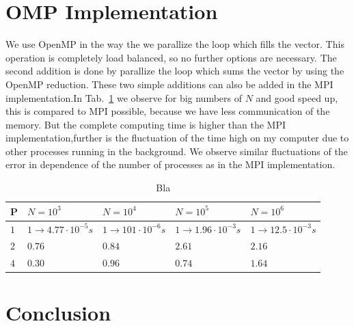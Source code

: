 \section{OMP Implementation}

We use OpenMP in the way the we parallize the loop which fills the vector. This operation is completely load balanced, so no further options are necessary. The second addition is done by parallize the loop which sums the vector by using the OpenMP reduction. These two simple additions can also be added in the MPI implementation.In Tab.~\ref{tab:speed_up1_omp} we observe for big numbers of $N$ and good speed up, this is compared to MPI possible, because we have less communication of the memory. But the complete computing time is higher than the MPI implementation,further is the fluctuation of the time high on my computer due to other processes running in the background. We observe similar fluctuations of the error in dependence of the number of processes as in the MPI implementation.
\begin{table}
\centering
    \begin{tabular}{| l | l | l | l | l |}
    
    \hline
    P & $N = 10^3$ & $N = 10^4$ & $N = 10^5$ & $N = 10^6$\\  \hline
	$1$ & $1 \rightarrow 4.77 \cdot 10^{-5} s$ & $1 \rightarrow 101 \cdot 10^{-6} s$ & $1 \rightarrow 1.96 \cdot 10^{-3} s$ & $1 \rightarrow 12.5 \cdot 10^{-3} s$\\    
    $2$ & $0.76$ & $0.84$ & $2.61$ &$2.16$ \\
    $4$ & $0.30$ & $0.96$ & $0.74$ &$1.64$ \\
    \hline
    
    \end{tabular}
    \caption{Bla}
    \label{tab:speed_up1_omp}
\end{table}

\section{Conclusion}

